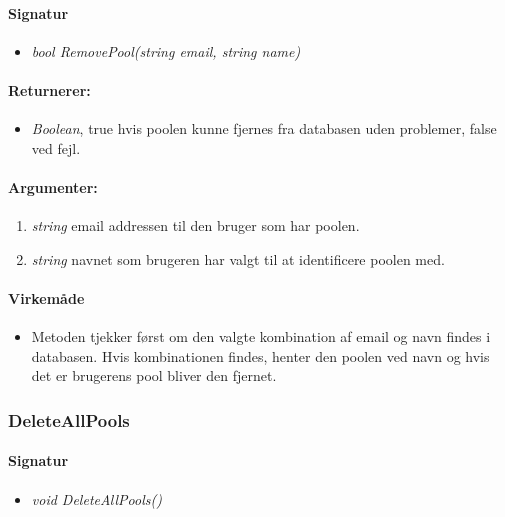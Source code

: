 \paragraph{Signatur}
\begin{itemize}
	\item \textit{bool RemovePool(string email, string name)}
\end{itemize}

\paragraph{Returnerer:}
\begin{itemize}
	\item \textit{Boolean}, true hvis poolen kunne fjernes fra databasen uden problemer, false ved fejl.
\end{itemize}

\paragraph{Argumenter:}
\begin{enumerate}
	\item \textit{string} email addressen til den bruger som har poolen.
	\item \textit{string} navnet som brugeren har valgt til at identificere poolen med.
\end{enumerate}

\paragraph{Virkemåde}
\begin{itemize}
	\item Metoden tjekker først om den valgte kombination af email og navn findes i databasen. Hvis kombinationen findes, henter den poolen ved navn og hvis det er brugerens pool bliver den fjernet.
\end{itemize}

\subsubsection{DeleteAllPools}%


\paragraph{Signatur}
\begin{itemize}
	\item \textit{void DeleteAllPools()}
\end{itemize}


